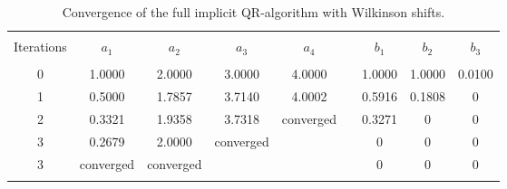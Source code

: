 \begin{table}
\begin{tabular}{ccccccccc}
 \hline
 \hline
\\
 Iterations &
 $a_1$ &
 $a_2$ &
 $a_3$ &
 $a_4$ &
&
 $b_1$ &
 $b_2$ &
 $b_3$ 
\\
 \hline
\\
0&
   1.0000&
   2.0000&
   3.0000&
   4.0000&
&  
   1.0000&
   1.0000&
   0.0100
\\
1&
   0.5000&
   1.7857&
   3.7140&
   4.0002&
&
   0.5916&
   0.1808&
        0
\\
2&
   0.3321&
   1.9358&
   3.7318&
   converged&
& 
   0.3271&
        0&
        0
\\
3&
   0.2679&
   2.0000&
   converged&
   &
&
        0&
        0&
        0
\\
3&
   converged&
   converged&
   &
   &
&
        0&
        0&
        0\\
\\
\hline
\hline
\end{tabular}
\caption{Convergence of the full implicit QR-algorithm with Wilkinson shifts.}
\end{table}

